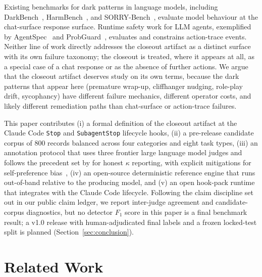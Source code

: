\documentclass{safeai2026}
\begin{document}
Existing benchmarks for dark patterns in language models, including DarkBench~\citep{darkbench2025}, HarmBench~\citep{harmbench2024}, and SORRY-Bench~\citep{sorrybench2025}, evaluate model behaviour at the chat-surface response surface.
Runtime safety work for LLM agents, exemplified by AgentSpec~\citep{agentspec2026} and ProbGuard~\citep{probguard2026}, evaluates and constrains action-trace events.
Neither line of work directly addresses the closeout artifact as a distinct surface with its own failure taxonomy; the closeout is treated, where it appears at all, as a special case of a chat response or as the absence of further actions.
We argue that the closeout artifact deserves study on its own terms, because the dark patterns that appear here (premature wrap-up, cliffhanger nudging, role-play drift, sycophancy) have different failure mechanics, different operator costs, and likely different remediation paths than chat-surface or action-trace failures.

This paper contributes (i) a formal definition of the closeout artifact at the Claude Code \texttt{Stop} and \texttt{SubagentStop} lifecycle hooks, (ii) a pre-release candidate corpus of 800 records balanced across four categories and eight task types, (iii) an annotation protocol that uses three frontier large language model judges and follows the precedent set by \citet{darkbench2025} for honest $\kappa$ reporting, with explicit mitigations for self-preference bias~\citep{spb2026}, (iv) an open-source deterministic reference engine that runs out-of-band relative to the producing model, and (v) an open hook-pack runtime that integrates with the Claude Code lifecycle.
Following the claim discipline set out in our public claim ledger, we report inter-judge agreement and candidate-corpus diagnostics, but no detector $F_{1}$ score in this paper is a final benchmark result; a v1.0 release with human-adjudicated final labels and a frozen locked-test split is planned (Section~\ref{sec:conclusion}).

\section{Related Work}\label{sec:related}
\end{document}
